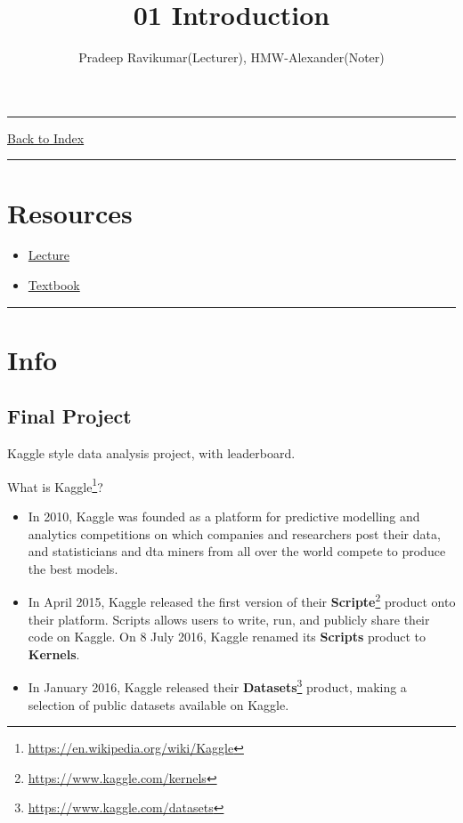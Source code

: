 \documentclass[letterpaper,10pt]{article}
\title{\textbf{01 Introduction}}
\author{Pradeep Ravikumar(Lecturer), HMW-Alexander(Noter)}
\newcommand{\panhline}{\begin{center}\rule{\textwidth}{1pt}\end{center}}
\begin{document}
\maketitle

\panhline
\href{../index.html}{Back to Index}

\panhline
\tableofcontents

\section*{Resources}

\begin{itemize}
	\item \href{../../Lectures/01_Introduction.pdf}{Lecture}
	\item \href{../../Books/Pattern_Recognition_And_Machine_Learning.pdf}{Textbook}
\end{itemize}

\panhline

\section{Info}

\subsection{Final Project}

Kaggle style data analysis project, with leaderboard.

What is Kaggle\footnote{\url{https://en.wikipedia.org/wiki/Kaggle}}?
\begin{itemize}
	\item In 2010, Kaggle was founded as a platform for predictive modelling and analytics competitions on which companies and researchers post their data, and statisticians and dta miners from all over the world compete to produce the best models.
	\item In April 2015, Kaggle released the first version of their \textbf{Scripte}\footnote{\url{https://www.kaggle.com/kernels}} product onto their platform. Scripts allows users to write, run, and publicly share their code on Kaggle. On 8 July 2016, Kaggle renamed its \textbf{Scripts} product to \textbf{Kernels}.
	\item In January 2016, Kaggle released their \textbf{Datasets}\footnote{\url{https://www.kaggle.com/datasets}} product, making a selection of public datasets available on Kaggle.
\end{itemize}
\end{document}
